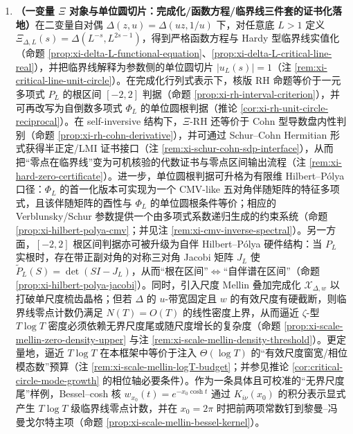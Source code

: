 \begin{enumerate}
  \item \textbf{（一变量 \texorpdfstring{$\Xi$}{Xi} 对象与单位圆切片：完成化/函数方程/临界线三件套的证书化落地）}在二变量自对偶 $\Delta(z,u)=\Delta(uz,1/u)$ 下，对任意底 \(L>1\) 定义 \(\Xi_{\Delta,L}(s)=\Delta(L^{-s},L^{2s-1})\)，得到严格函数方程与 Hardy 型临界线实值化（命题 \ref{prop:xi-delta-L-functional-equation}、\ref{prop:xi-delta-L-critical-line-real}），并把临界线解释为参数侧的单位圆切片 \(|u_L(s)|=1\)（注 \ref{rem:xi-critical-line-unit-circle}）。在完成化行列式表示下，核版 RH 命题等价于一元多项式 \(P_L\) 的根区间 \([-2,2]\) 判据（命题 \ref{prop:xi-rh-interval-criterion}），并可再改写为自倒数多项式 \(\Phi_L\) 的单位圆根判据（推论 \ref{cor:xi-rh-unit-circle-reciprocal}）。在 self-inversive 结构下，\(\Xi\)-RH 还等价于 Cohn 型导数盘内性判别（命题 \ref{prop:xi-rh-cohn-derivative}），并可通过 Schur--Cohn Hermitian 形式获得半正定/LMI 证书接口（注 \ref{rem:xi-schur-cohn-sdp-interface}），从而把“零点在临界线”变为可机核验的代数证书与零点区间输出流程（注 \ref{rem:xi-hard-zero-certificate}）。进一步，单位圆根判据可升格为有限维 Hilbert--P{\'o}lya 口径：\(\Phi_L\) 的首一化版本可实现为一个 CMV-like 五对角伴随矩阵的特征多项式，且该伴随矩阵的酉性与 \(\Phi_L\) 的单位圆根条件等价；相应的 Verblunsky/Schur 参数提供一个由多项式系数递归生成的约束系统（命题 \ref{prop:xi-hilbert-polya-cmv}；并见注 \ref{rem:xi-cmv-inverse-spectral}）。另一方面，\([-2,2]\) 根区间判据亦可被升级为自伴 Hilbert--P{\'o}lya 硬件结构：当 \(P_L\) 实根时，存在带正副对角的对称三对角 Jacobi 矩阵 \(J_L\) 使 \(\widetilde P_L(S)=\det(SI-J_L)\)，从而“根在区间”\(\Leftrightarrow\)“自伴谱在区间”（命题 \ref{prop:xi-hilbert-polya-jacobi}）。同时，引入尺度 Mellin 叠加完成化 \(\mathcal X_{\Delta,w}\) 以打破单尺度梳齿晶格；但若 \(\Delta\) 的 \(u\)-带宽固定且 \(w\) 的有效尺度有硬截断，则临界线零点计数仍满足 \(N(T)=O(T)\) 的线性密度上界，从而逼近 \(\zeta\)-型 \(T\log T\) 密度必须依赖无界尺度尾或随尺度增长的复杂度（命题 \ref{prop:xi-scale-mellin-zero-density-upper} 与注 \ref{rem:xi-scale-mellin-density-threshold}）。更定量地，逼近 \(T\log T\) 在本框架中等价于注入 \(\Theta(\log T)\) 的“有效尺度窗宽/相位模态数”预算（注 \ref{rem:xi-scale-mellin-logT-budget}；并参见推论 \ref{cor:critical-circle-mode-growth} 的相位轴必要条件）。作为一条具体且可校准的“无界尺度尾”样例，Bessel--cosh 核 \(w_{x_0}(t)=e^{-x_0\cosh t}\) 通过 \(K_{i\nu}(x_0)\) 的积分表示显式产生 \(T\log T\) 级临界线零点计数，并在 \(x_0=2\pi\) 时把前两项常数钉到黎曼--冯\,曼戈尔特主项（命题 \ref{prop:xi-scale-mellin-bessel-kernel}）。

\end{enumerate}
